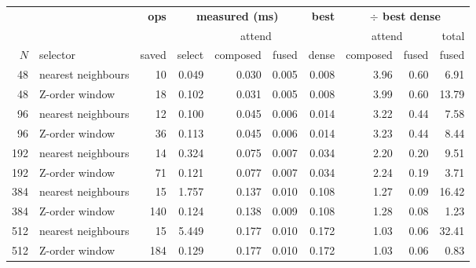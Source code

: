 \begin{tabular}{rlr rrr r rrr}
\toprule
& & \textbf{ops} & \multicolumn{3}{c}{\textbf{measured (ms)}} & \textbf{best}
& \multicolumn{3}{c}{\textbf{$\div$ best dense}} \\
\cmidrule(lr){4-6}\cmidrule(lr){8-10}
& & & & \multicolumn{2}{c}{attend} & & \multicolumn{2}{c}{attend} & total \\
\cmidrule(lr){5-6}\cmidrule(lr){8-9}
$N$ & selector & saved & select & composed & fused & dense & composed & fused
& fused \\
\midrule
48 & nearest neighbours & 10 & 0.049 & 0.030 & 0.005 & 0.008 & 3.96 & 0.60 & 6.91 \\
48 & Z-order window & 18 & 0.102 & 0.031 & 0.005 & 0.008 & 3.99 & 0.60 & 13.79 \\
96 & nearest neighbours & 12 & 0.100 & 0.045 & 0.006 & 0.014 & 3.22 & 0.44 & 7.58 \\
96 & Z-order window & 36 & 0.113 & 0.045 & 0.006 & 0.014 & 3.23 & 0.44 & 8.44 \\
192 & nearest neighbours & 14 & 0.324 & 0.075 & 0.007 & 0.034 & 2.20 & 0.20 & 9.51 \\
192 & Z-order window & 71 & 0.121 & 0.077 & 0.007 & 0.034 & 2.24 & 0.19 & 3.71 \\
384 & nearest neighbours & 15 & 1.757 & 0.137 & 0.010 & 0.108 & 1.27 & 0.09 & 16.42 \\
384 & Z-order window & 140 & 0.124 & 0.138 & 0.009 & 0.108 & 1.28 & 0.08 & 1.23 \\
512 & nearest neighbours & 15 & 5.449 & 0.177 & 0.010 & 0.172 & 1.03 & 0.06 & 32.41 \\
512 & Z-order window & 184 & 0.129 & 0.177 & 0.010 & 0.172 & 1.03 & 0.06 & 0.83 \\
\bottomrule
\end{tabular}%
